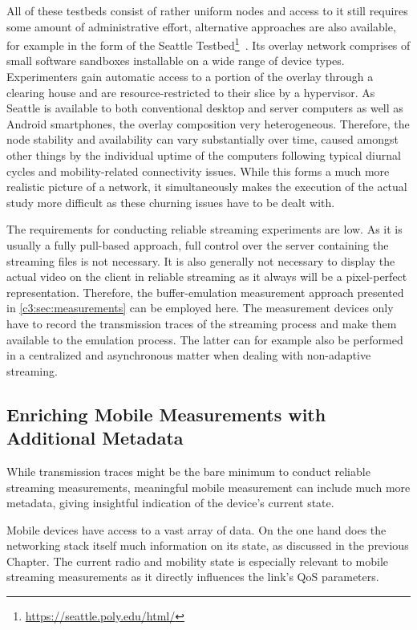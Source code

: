 All of these testbeds consist of rather uniform nodes and access to it still requires some amount of administrative effort, alternative approaches are also available, for example in the form of the Seattle Testbed\footnote{\url{https://seattle.poly.edu/html/}}~\cite{Cappos:2009:SPE:1508865.1508905}. Its overlay network comprises of small software sandboxes installable on a wide range of device types. Experimenters gain automatic access to a portion of the overlay through a clearing house and are resource-restricted to their slice by a hypervisor. As Seattle is available to both conventional desktop and server computers as well as Android smartphones, the overlay composition very heterogeneous. Therefore, the node stability and availability can vary substantially over time, caused amongst other things by the individual uptime of the computers following typical diurnal cycles and mobility-related connectivity issues.
While this forms a much more realistic picture of a network, it simultaneously makes the execution of the actual study more difficult as these churning issues have to be dealt with.

The requirements for conducting reliable streaming experiments are low. As it is usually a fully pull-based approach, full control over the server containing the streaming files is not necessary. It is also generally not necessary to display the actual video on the client in reliable streaming as it always will be a pixel-perfect representation. Therefore, the buffer-emulation measurement approach presented in \ref{c3:sec:measurements} can be employed here. The measurement devices only have to record the transmission traces of the streaming process and make them available to the emulation process. The latter can for example also be performed in a centralized and asynchronous matter when dealing with non-adaptive streaming.


\subsection{Enriching Mobile Measurements with Additional Metadata}
\label{c6:sec:sensorium}

While transmission traces might be the bare minimum to conduct reliable streaming measurements, meaningful mobile measurement can include much more metadata, giving insightful indication of the device's current state.

Mobile devices have access to a vast array of data. On the one hand does the networking stack itself much information on its state, as discussed in the previous Chapter. The current radio and mobility state is especially relevant to mobile streaming measurements as it directly influences the link's \gls{QoS} parameters. 


